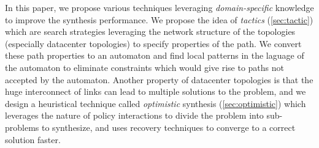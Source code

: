 \documentclass[]{sig}
\begin{document}
In this paper, we propose various techniques leveraging \emph{domain-specific} knowledge to improve the synthesis performance. We propose the idea of \emph{tactics} (\cref{sec:tactic}) which are search strategies leveraging the network structure of the topologies (especially datacenter topologies) to specify properties of the path. We convert these path properties to an automaton and find local patterns in the laguage of the automaton to eliminate constraints which would give rise to paths not accepted by the automaton. Another property of datacenter topologies is that the huge interconnect of links can lead to multiple solutions to the problem, and we design a heuristical technique called \emph{optimistic} synthesis (\cref{sec:optimistic}) which leverages the nature of policy interactions to divide the problem into sub-problems to synthesize, and uses recovery techniques to converge to a correct solution faster. 
\end{document}
